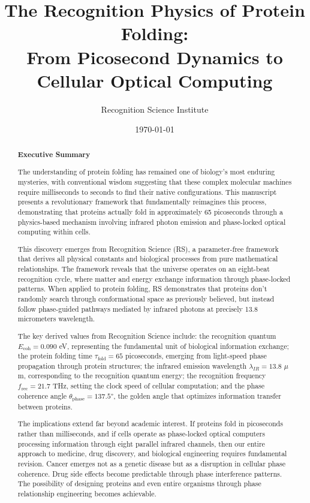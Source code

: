 \documentclass[12pt,a4paper]{report}
\title{The Recognition Physics of Protein Folding:\\From Picosecond Dynamics to Cellular Optical Computing}
\author{Recognition Science Institute}
\date{\today}
\begin{document}
\maketitle
\tableofcontents

\begin{abstract}
\textbf{Executive Summary}

The understanding of protein folding has remained one of biology's most enduring mysteries, with conventional wisdom suggesting that these complex molecular machines require milliseconds to seconds to find their native configurations. This manuscript presents a revolutionary framework that fundamentally reimagines this process, demonstrating that proteins actually fold in approximately 65 picoseconds through a physics-based mechanism involving infrared photon emission and phase-locked optical computing within cells.

This discovery emerges from Recognition Science (RS), a parameter-free framework that derives all physical constants and biological processes from pure mathematical relationships. The framework reveals that the universe operates on an eight-beat recognition cycle, where matter and energy exchange information through phase-locked patterns. When applied to protein folding, RS demonstrates that proteins don't randomly search through conformational space as previously believed, but instead follow phase-guided pathways mediated by infrared photons at precisely 13.8 micrometers wavelength.

The key derived values from Recognition Science include: the recognition quantum $E_{\text{coh}} = 0.090$ eV, representing the fundamental unit of biological information exchange; the protein folding time $\tau_{\text{fold}} = 65$ picoseconds, emerging from light-speed phase propagation through protein structures; the infrared emission wavelength $\lambda_{IR} = 13.8$ $\mu$m, corresponding to the recognition quantum energy; the recognition frequency $f_{\text{rec}} = 21.7$ THz, setting the clock speed of cellular computation; and the phase coherence angle $\theta_{\text{phase}} = 137.5°$, the golden angle that optimizes information transfer between proteins.

The implications extend far beyond academic interest. If proteins fold in picoseconds rather than milliseconds, and if cells operate as phase-locked optical computers processing information through eight parallel infrared channels, then our entire approach to medicine, drug discovery, and biological engineering requires fundamental revision. Cancer emerges not as a genetic disease but as a disruption in cellular phase coherence. Drug side effects become predictable through phase interference patterns. The possibility of designing proteins and even entire organisms through phase relationship engineering becomes achievable.


\end{abstract}
\end{document}
